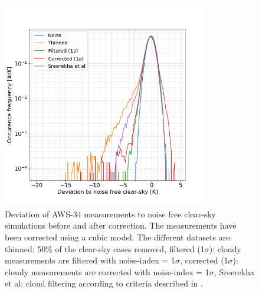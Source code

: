 \documentclass[12pt]{article}
\begin{document}
\begin{figure}[!]
	\centering
	\includegraphics[height=90mm]{PDF_corrected_AWS-34_AWS-42_thinned}
	\caption{Deviation of AWS-34 measurements to noise free clear-sky
      simulations before and after correction. The measurements have been
      corrected using a cubic model. The different datasets are: thinned: 50\%
      of the clear-sky cases removed, filtered (1$\sigma$): cloudy measurements
      are filtered with noise-index = 1$\sigma$, corrected (1$\sigma$): cloudy
      measurements are corrected with noise-index = 1$\sigma$, Sreerekha et al:
      cloud filtering according to criteria described in
      \cite{rekha2012potential}.}
	\label{fig:correction:c34-42:thinned}
\end{figure}
%
\end{document}
